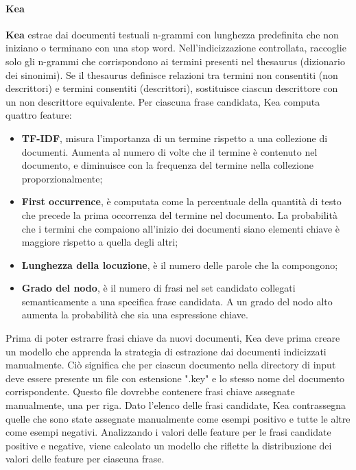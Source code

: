 \paragraph{Kea}
\textbf{Kea} estrae dai documenti testuali n-grammi con lunghezza predefinita che non iniziano o terminano con una stop word. Nell'indicizzazione controllata, raccoglie solo gli n-grammi che corrispondono ai termini presenti nel thesaurus (dizionario dei sinonimi). Se il thesaurus definisce relazioni tra termini non consentiti (non descrittori) e termini consentiti (descrittori), sostituisce ciascun descrittore con un non descrittore equivalente. Per ciascuna frase candidata, Kea computa quattro feature:
\begin{itemize}
\item{\textbf{TF-IDF}}, misura l'importanza di un termine rispetto a una collezione di documenti. Aumenta al numero di volte che il termine è contenuto nel documento, e diminuisce con la frequenza del termine nella collezione proporzionalmente;
\item{\textbf{First occurrence}}, è computata come la percentuale della quantità di testo che precede la prima occorrenza del termine nel documento. La probabilità che i termini che compaiono all'inizio dei documenti siano elementi chiave è maggiore rispetto a quella degli altri;
\item{\textbf{Lunghezza della locuzione}}, è il numero delle parole che la compongono;
\item{\textbf{Grado del nodo}}, è il numero di frasi nel set candidato collegati semanticamente a una specifica frase candidata. A un grado del nodo alto aumenta la probabilità che sia una espressione chiave.
\end{itemize}

Prima di poter estrarre frasi chiave da nuovi documenti, Kea deve prima creare un modello che apprenda la strategia di estrazione dai documenti indicizzati manualmente. Ciò significa che per ciascun documento nella directory di input deve essere presente un file con estensione ".key" e lo stesso nome del documento corrispondente. Questo file dovrebbe contenere frasi chiave assegnate manualmente, una per riga.
Dato l'elenco delle frasi candidate, Kea contrassegna quelle che sono state assegnate manualmente come esempi positivo e tutte le altre come esempi negativi. Analizzando i valori delle feature per le frasi candidate positive e negative, viene calcolato un modello che riflette la distribuzione dei valori delle feature per ciascuna frase.


